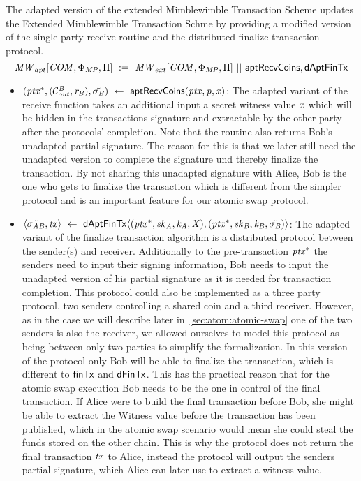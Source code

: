 \begin{definition}
    \label{def:atom:apt-ext-mw-tx-scheme}
    The adapted version of the extended Mimblewimble Transaction Scheme updates the Extended Mimblewimble Transaction Schme by providing a modified version of the single party receive routine and the distributed finalize transaction protocol.
    \[ \mathit{MW}_{apt}[\mathit{COM},\Phi_{\mathit{MP}},\Pi] ~:=~ \mathit{MW}_{ext}[\mathit{COM},\Phi_{\mathit{MP}},\Pi] ~||~ \mathsf{aptRecvCoins}, \mathsf{dAptFinTx} \]
    \begin{itemize}
        \item $(\mathit{ptx}^*, (\mathcal{C}_{\mathit{out}}^{\mathit{B}},\mathit{r}_{\mathit{B}}), \tilde{\sigma_{\mathit{B}}}) ~\leftarrow~ \mathsf{aptRecvCoins}(\mathit{ptx},\mathit{p},\mathit{x})$: The adapted variant of the receive function takes an additional input a secret witness value
        $\mathit{x}$ which will be hidden in the transactions signature and extractable by the other party after the protocols' completion.
        Note that the routine also returns Bob's unadapted partial signature.
        The reason for this is that we later still need the unadapted version to complete the signature und thereby finalize the transaction.
        By not sharing this unadapted signature with Alice, Bob is the one who gets to finalize the transaction which is different from the simpler protocol and is an important feature for our atomic swap protocol.
        \item $\langle \tilde{\sigma_{\mathit{A}\mathit{B}}}, \mathit{tx} \rangle ~\leftarrow~ \mathsf{dAptFinTx} \langle (\mathit{ptx}^*,\mathit{sk}_{\mathit{A}},\mathit{\mathit{k}_{\mathit{A}}},\mathit{X}), (\mathit{ptx}^*,\mathit{sk}_{\mathit{B}},\mathit{\mathit{k}_{\mathit{B}}},\tilde{\sigma_{\mathit{B}}}) \rangle$: The adapted variant of the finalize transaction algorithm is a distributed protocol between the sender(s) and receiver.
        Additionally to the pre-transaction $\mathit{ptx}^*$ the senders need to input their signing information, Bob needs to input the unadapted version of his partial signature as it is needed for transaction completion.
        This protocol could also be implemented as a three party protocol, two senders controlling a shared coin and a third receiver.
        However, as in the case we will describe later in~\ref{sec:atom:atomic-swap} one of the two senders is also the receiver, we allowed ourselves to model this protocol as being between only two parties to simplify the formalization.
        In this version of the protocol only Bob will be able to finalize the transaction, which is different to $\mathsf{finTx}$ and $\mathsf{dFinTx}$.
        This has the practical reason that for the atomic swap execution Bob needs to be the one in control of the final transaction.
        If Alice were to build the final transaction before Bob, she might be able to extract the Witness value before the transaction has been published, which in the atomic swap scenario would mean she could steal the funds stored on the other chain.
        This is why the protocol does not return the final transaction $\mathit{tx}$ to Alice, instead the protocol will output the senders partial signature, which Alice can later use to extract a witness value.
    \end{itemize}
\end{definition}

